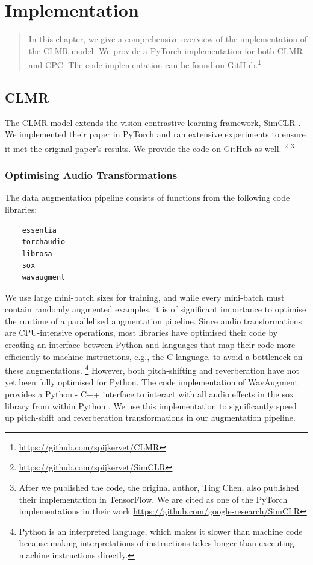 \chapter{Implementation}
\begin{quote}
    In this chapter, we give a comprehensive overview of the implementation of the CLMR model. We provide a PyTorch \cite{pytorch2019} implementation for both CLMR and CPC. The code implementation can be found on GitHub.\footnote{\url{https://github.com/spijkervet/CLMR}}
\end{quote}


\section{CLMR}
The CLMR model extends the vision contrastive learning framework, SimCLR \cite{chen_simple_2020}. We implemented their paper in PyTorch and ran extensive experiments to ensure it met the original paper's results.
We provide the code on GitHub as well.
\footnote{\url{https://github.com/spijkervet/SimCLR}}
\footnote{After we published the code, the original author, Ting Chen, also published their implementation in TensorFlow. We are cited as one of the PyTorch implementations in their work \url{https://github.com/google-research/SimCLR}}

\subsection{Optimising Audio Transformations}
The data augmentation pipeline consists of functions from the following code libraries:
\begin{verbatim}
    essentia
    torchaudio
    librosa
    sox
    wavaugment
\end{verbatim}
We use large mini-batch sizes for training, and while every mini-batch must contain randomly augmented examples, it is of significant importance to optimise the runtime of a parallelised augmentation pipeline.
Since audio transformations are CPU-intensive operations, most libraries have optimised their code by creating an interface between Python and languages that map their code more efficiently to machine instructions, e.g., the C language, to avoid a bottleneck on these augmentations.
\footnote{Python is an interpreted language, which makes it slower than machine code because making interpretations of instructions takes longer than executing machine instructions directly.}
However, both pitch-shifting and reverberation have not yet been fully optimised for Python. The code implementation of WavAugment provides a Python - C++ interface to interact with all audio effects in the sox library from within Python \cite{wavaugment2020}.
We use this implementation to significantly speed up pitch-shift and reverberation transformations in our augmentation pipeline.

